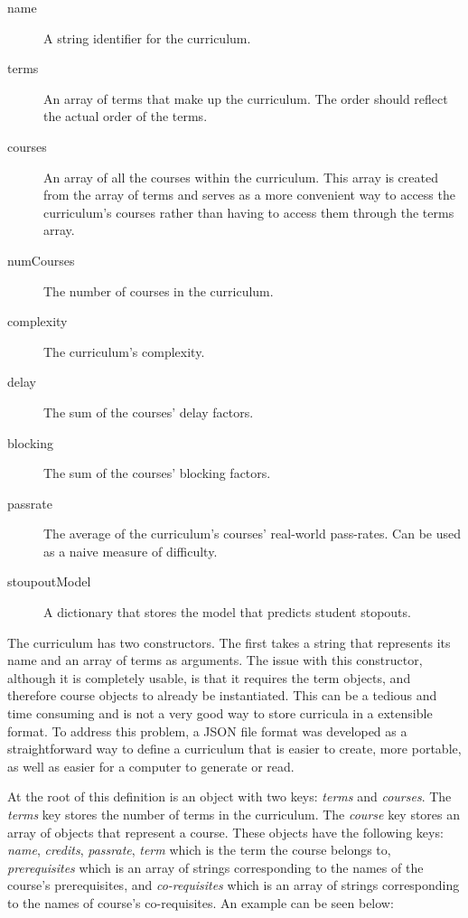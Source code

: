 \documentclass[botnum, fleqn]{unmeethesis}
\begin{document}
      \begin{description}
        \item [name] A string identifier for the curriculum.
        \item [terms] An array of terms that make up the curriculum. The order should reflect the actual order of the terms.
        \item [courses] An array of all the courses within the curriculum. This array is created from the array of terms and serves as a more convenient way to access the curriculum's courses rather than having to access them through the terms array.
        \item [numCourses] The number of courses in the curriculum.
        \item [complexity] The curriculum's complexity.
        \item [delay] The sum of the courses' delay factors.
        \item [blocking] The sum of the courses' blocking factors.
        \item [passrate] The average of the curriculum's courses' real-world pass-rates. Can be used as a naive measure of difficulty.
        \item [stoupoutModel] A dictionary that stores the model that predicts student stopouts.
      \end{description}

      The curriculum has two constructors. The first takes a string that represents its name and an array of terms as arguments. The issue with this constructor, although it is completely usable, is that it requires the term objects, and therefore course objects to already be instantiated. This can be a tedious and time consuming and is not a very good way to store curricula in a extensible format. To address this problem, a JSON file format was developed as a straightforward way to define a curriculum that is easier to create, more portable, as well as easier for a computer to generate or read.

      At the root of this definition is an object with two keys: \textit{terms} and \textit{courses}. The \textit{terms} key stores the number of terms in the curriculum. The \textit{course} key stores an array of objects that represent a course. These objects have the following keys: \textit{name}, \textit{credits}, \textit{passrate}, \textit{term} which is the term the course belongs to, \textit{prerequisites} which is an array of strings corresponding to the names of the course's prerequisites, and \textit{co-requisites} which is an array of strings corresponding to the names of course's co-requisites. An example can be seen below:
\end{document}
